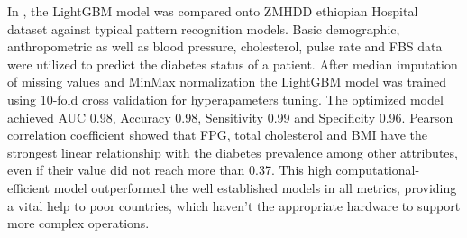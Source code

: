 \documentclass[journal,article,submit,pdftex,moreauthors]{Definitions/mdpi}
\begin{document}
\par In \cite{Rufo}, the LightGBM model was compared onto ZMHDD ethiopian Hospital dataset against typical pattern recognition
models. Basic demographic, anthropometric as well as blood pressure, cholesterol, pulse rate and FBS data were utilized to predict
the diabetes status of a patient. After median imputation of missing values and MinMax normalization the LightGBM model was trained
using 10-fold cross validation for hyperapameters tuning. The optimized model achieved  AUC 0.98, Accuracy 0.98, Sensitivity 0.99 and
Specificity 0.96. Pearson correlation coefficient showed that FPG, total cholesterol and BMI have the strongest linear relationship
with the diabetes prevalence among other attributes, even if their value did not reach more than 0.37. 
This high computational-efficient model outperformed the well established models in all metrics, providing
a vital help to poor countries, which haven't the appropriate hardware  to support more complex operations.
\end{document}
